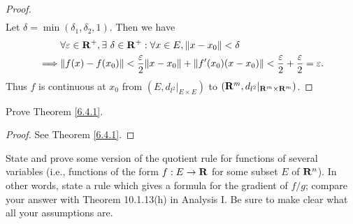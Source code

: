 \begin{proof}
\begin{align*}
    \end{align*}
    Let \(\delta = \min(\delta_1, \delta_2, 1)\).
    Then we have
    \begin{align*}
                 & \forall \varepsilon \in \R^+, \exists\ \delta \in \R^+ : \forall x \in E, \norm*{x - x_0} < \delta                                                      \\
        \implies & \norm*{f(x) - f(x_0)} < \frac{\varepsilon}{2} \norm*{x - x_0} + \norm*{f'(x_0)(x - x_0)} < \frac{\varepsilon}{2} + \frac{\varepsilon}{2} = \varepsilon.
    \end{align*}
    Thus \(f\) is continuous at \(x_0\) from \((E, d_{l^2}|_{E \times E})\) to \((\mathbf{R}^m, d_{l^2}|_{\mathbf{R}^m \times \mathbf{R}^m})\).
\end{proof}

\begin{exercise}\label{ex 6.4.3}
    Prove Theorem \ref{6.4.1}.
\end{exercise}

\begin{proof}
    See Theorem \ref{6.4.1}.
\end{proof}

\begin{exercise}\label{ex 6.4.4}
    State and prove some version of the quotient rule for functions of several variables (i.e., functions of the form \(f : E \to \mathbf{R}\) for some subset \(E\) of \(\mathbf{R}^n\)).
    In other words, state a rule which gives a formula for the gradient of \(f / g\);
    compare your answer with Theorem 10.1.13(h) in Analysis I.
    Be sure to make clear what all your assumptions are.
\end{exercise}

